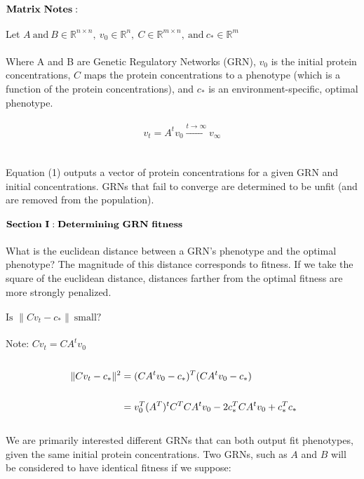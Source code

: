\documentclass[a4paper,12pt]{article}
\begin{document}
$ \bold{Matrix \ Notes:}$ \\ \\
Let $ A\ \mbox{and} \ B \in \mathbb{R}^{n \times n}, \ v_{0} \in \mathbb{R}^{n}, \ C \in \mathbb{R}^{m \times n},\ \mbox{and}  \ c_{*} \in \mathbb{R}^{m}$ \\ \\
Where A and B are Genetic Regulatory Networks (GRN), $v_{0}$ is the initial protein concentrations,     $C$ maps the protein concentrations to a phenotype (which is a function of the protein concentrations), and $c_{*}$ is an environment-specific, optimal phenotype. \\ \\
\begin{equation}
v_{t} = A^{t}v_{0} \xrightarrow{t \rightarrow \infty} v_{\infty}
\end{equation} \\ \\
Equation (1)  outputs a vector of protein concentrations for a given GRN and initial concentrations.  GRNs that fail to converge are determined to be unfit (and are removed from the population). \\ \\
$\bold{Section\ I: Determining \ GRN\ fitness}$\\ \\
What is the euclidean distance between a GRN's phenotype and the optimal phenotype? The magnitude of this distance corresponds to fitness. If we take the square of the euclidean distance, distances farther from the optimal fitness are more strongly penalized. 
\\ \\ 
$ \mbox{Is } \lVert Cv_{t} - c_{*} \rVert
\ \mbox{small?}$ \\ \\
Note: $Cv_{t} = CA^{t}v_{0}$ \\ \\
\begin{align} \begin{split}
\lVert Cv_{t} - c_{*} \rVert^{2} &= (CA^{t}v_{0} - c_{*})^{T}(CA^{t}v_{0} - c_{*}) \\ \\
\indent \indent \indent \ \ \ &= v_{0}^{T}(A^{T})^{t}C^{T}CA^{t}v_{0} - 2c_{*}^{T}CA^{t}v_{0} + c_{*}^{T}c_{*}
\end{split} \end{align} \\
We are primarily interested different GRNs that can both output fit phenotypes, given the same initial protein concentrations. Two GRNs, such as $A$ and $B$ will be considered to have identical fitness if we suppose: 
\end{document}
